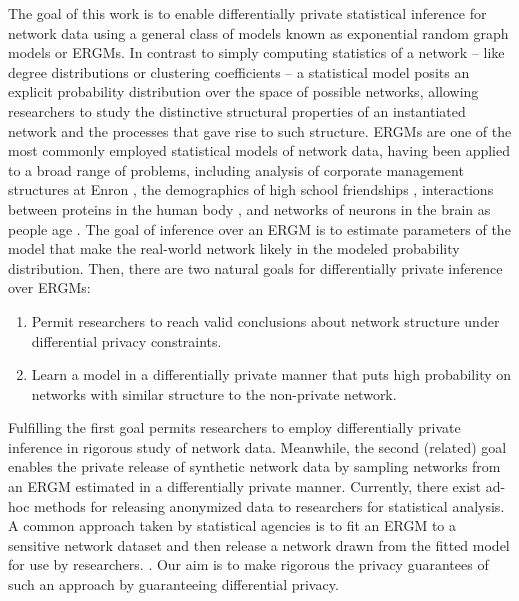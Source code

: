 The goal of this work is to enable differentially private statistical inference for network data using a general class of models known as exponential random graph models or ERGMs. In contrast to simply computing statistics of a network -- like degree distributions or clustering coefficients -- a statistical model posits an explicit probability distribution over the space of possible networks, allowing researchers to study the distinctive structural properties of an instantiated network and the processes that gave rise to such structure. ERGMs are one of the most commonly employed statistical models of network data, having been applied to a broad range of problems, including analysis of corporate management structures at Enron \cite{UHH13}, the demographics of high school friendships \cite{GKM09}, interactions between proteins in the human body \cite{EBB10}, and networks of neurons in the brain as people age  \cite{Sin+16}. The goal of inference over an ERGM is to estimate parameters of the model that make the real-world network  likely in the modeled probability distribution. Then, there are two natural goals for differentially private inference over ERGMs:
\vspace{-1.5em}
\begin{enumerate}
	\item Permit researchers to reach valid conclusions about network structure under differential privacy constraints.
	\item Learn a model in a differentially private manner that puts high probability on networks with similar structure to the non-private network.
\end{enumerate}
\vspace{-1.5em}
Fulfilling the first goal permits researchers to employ differentially private inference in rigorous study of network data. Meanwhile, the second (related) goal enables the private release of synthetic network data by sampling networks from an ERGM estimated in a differentially private manner. Currently, there exist ad-hoc methods for releasing anonymized data to researchers for statistical analysis. A common approach taken by statistical agencies is to fit an ERGM to a sensitive network dataset and then release a network drawn from the fitted model for use by researchers. \cite{ergm}. Our aim is to make rigorous the privacy guarantees of such an approach by guaranteeing differential privacy. 

